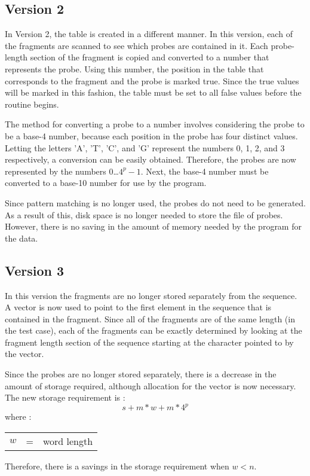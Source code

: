 \subsection{Version 2}
In Version 2, the table is created in a different manner.  In this version,
each of the fragments are scanned to see which probes are contained in it.
Each probe-length section of the
fragment is copied and converted to a number that represents the probe.
Using this number, the position in the table that corresponds to the
fragment and the probe is marked true.  Since the true values will be
marked in this fashion, the table must be set to all false values before
the routine begins.

The method for converting a probe to a number involves considering the
probe to be a base-4 number, because each position in the probe has four
distinct values.  Letting the letters 'A', 'T', 'C', and 'G'
represent the numbers 0, 1, 2, and 3 respectively, a conversion can be
easily obtained.  Therefore, the probes are now represented by the numbers
0\ldots $4^p-1$.  Next, the base-4 number must be converted to a base-10
number for use by the program.

Since pattern matching is no longer used, the probes do not need to be
generated.  As a result of this, disk space is no longer needed to
store the file of probes.  However, there is no saving in the amount of
memory needed by the program for the data.

\subsection{Version 3}

In this version the fragments are no longer stored separately from the
sequence.  A vector is now used to point to the first element in the
sequence that is contained in the fragment.  Since all of the fragments are
of the same length (in the test case), each of the fragments can be exactly
determined by looking at the fragment length section of the sequence
starting at the character pointed to by the vector.

Since the probes are no longer stored separately, there is a decrease in
the amount of storage required, although allocation for the vector is
now necessary.  The new storage requirement is :
\[ s + m*w + m*4^p \]
where :
\begin{center}
\begin{tabular}{ccl}
$w$ & = & word length \\
\end{tabular}
\end{center}
Therefore, there is a savings in the storage requirement when $w<n$.

